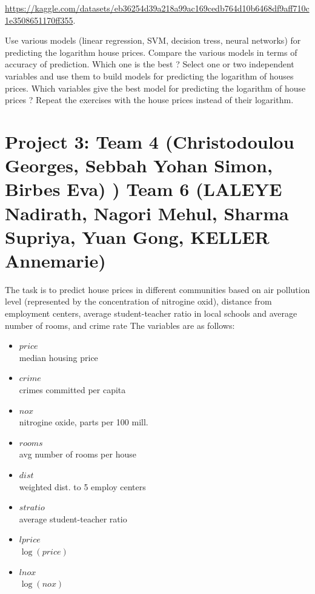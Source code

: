 \documentclass{article}
\begin{document}
   \url{https://kaggle.com/datasets/eb36254d39a218a99ac169cedb764d10b6468df9aff710c1e3508651170ff355}.

   Use various models (linear regression, SVM, decision tress, neural networks) for predicting the logarithm house prices. Compare the various models in terms of accuracy of prediction. Which one is the best ? 
 Select one or two independent variables  and use them to build models for predicting the logarithm of houses prices. Which variables give the best model for predicting  the logarithm of house prices  ?  Repeat the exercises with the house prices instead of their logarithm. 
 
 


\section*{Project 3: Team 4 (Christodoulou Georges, Sebbah Yohan Simon, Birbes Eva)
) Team 6 (LALEYE Nadirath, Nagori Mehul, Sharma	Supriya, Yuan	Gong, KELLER Annemarie) }


    The task is to predict house prices in different communities based on air pollution level (represented by the concentration of nitrogine oxid), 
distance from employment centers, average student-teacher ratio 
 in local schools and average number of rooms, and crime rate The variables are as follows:
    \begin{itemize}
    \item{$price$ \\}       
	median housing price
    \item{$crime$ \\}                    
		crimes committed per capita
    \item{$nox$ \\}                      
	nitrogine oxide, parts per 100 mill.
    \item{$rooms$ \\}                    
    avg number of rooms per house
    \item{$dist$ \\}                     
      weighted dist. to 5 employ centers
    \item{$stratio$ \\}                  average student-teacher ratio
    \item{$lprice$ \\}                   $\log(price)$
    \item{$lnox$ \\}                     $\log(nox)$
   \end{itemize}
\end{document}
